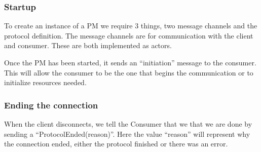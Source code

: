 \subsubsection{Startup}
To create an instance of a PM we require 3 things, two message channels and the protocol definition. The message channels are for communication with the client and consumer. These are both implemented as actors. 

Once the PM has been started, it sends an ``initiation'' message to the consumer. This will allow the consumer to be the one that begins the communication or to initialize resources needed.

\subsubsection{Ending the connection}
When the client disconnects, we tell the Consumer that we that we are done by sending a ``ProtocolEnded(reason)''. Here the value ``reason'' will represent why the connection ended, either the protocol finished or there was an error.

%




